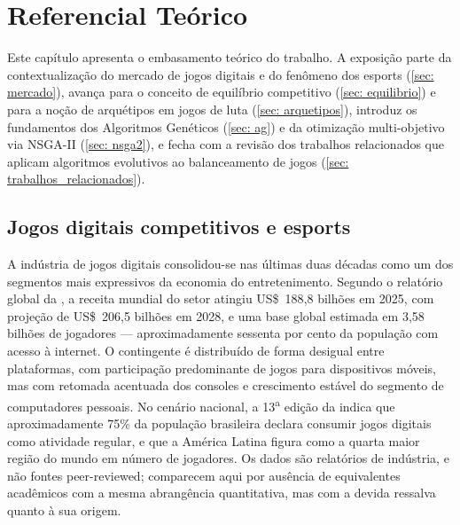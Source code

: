\chapter[Referencial Teórico]{Referencial Teórico}
\label{chap: fundamentacao}

Este capítulo apresenta o embasamento teórico do trabalho. A exposição parte da contextualização do mercado de jogos digitais e do fenômeno dos esports (\autoref{sec: mercado}), avança para o conceito de equilíbrio competitivo (\autoref{sec: equilibrio}) e para a noção de arquétipos em jogos de luta (\autoref{sec: arquetipos}), introduz os fundamentos dos Algoritmos Genéticos (\autoref{sec: ag}) e da otimização multi-objetivo via NSGA-II (\autoref{sec: nsga2}), e fecha com a revisão dos trabalhos relacionados que aplicam algoritmos evolutivos ao balanceamento de jogos (\autoref{sec: trabalhos_relacionados}).

\section{Jogos digitais competitivos e esports}
\label{sec: mercado}

A indústria de jogos digitais consolidou-se nas últimas duas décadas como um dos segmentos mais expressivos da economia do entretenimento. Segundo o relatório global da , a receita mundial do setor atingiu US\$~188{,}8 bilhões em 2025, com projeção de US\$~206{,}5 bilhões em 2028, e uma base global estimada em 3{,}58 bilhões de jogadores --- aproximadamente sessenta por cento da população com acesso à internet. O contingente é distribuído de forma desigual entre plataformas, com participação predominante de jogos para dispositivos móveis, mas com retomada acentuada dos consoles e crescimento estável do segmento de computadores pessoais. No cenário nacional, a 13\textsuperscript{a} edição da  indica que aproximadamente 75\% da população brasileira declara consumir jogos digitais como atividade regular, e que a América Latina figura como a quarta maior região do mundo em número de jogadores. Os dados são relatórios de indústria, e não fontes peer-reviewed; comparecem aqui por ausência de equivalentes acadêmicos com a mesma abrangência quantitativa, mas com a devida ressalva quanto à sua origem.

